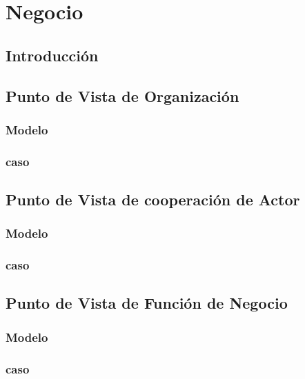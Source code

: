 \chapter{Negocio}

\section{Introducción}

\section{Punto de Vista de Organización}

\subsection{Modelo}

\newpage

\subsection{caso}

\newpage

\section{Punto de Vista de cooperación de Actor}

\subsection{Modelo}

\newpage

\subsection{caso}

\newpage

\section{Punto de Vista de Función de Negocio}

\subsection{Modelo}

\newpage

\subsection{caso}

